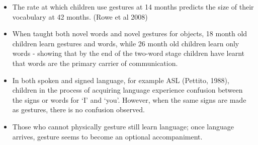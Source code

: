 \documentclass{article}
\begin{document}
\begin{itemize}
    \item The rate at which children use gestures at 14 months predicts the size of their vocabulary at 42 months. (Rowe et al 2008)
    \item When taught both novel words and novel gestures for objects, 18 month old children learn gestures and words, while 26 month old children learn only words - showing that by the end of the two-word stage children have learnt that words are the primary carrier of communication.
    \item In both spoken and signed language, for example ASL (Pettito, 1988), children in the process of acquiring language experience confusion between the signs or words for `I' and `you'. However, when the same signs are made as gestures, there is no confusion observed.
    \item Those who cannot physically gesture still learn language; once language arrives, gesture seems to become an optional accompaniment.

\end{itemize}
\end{document}
